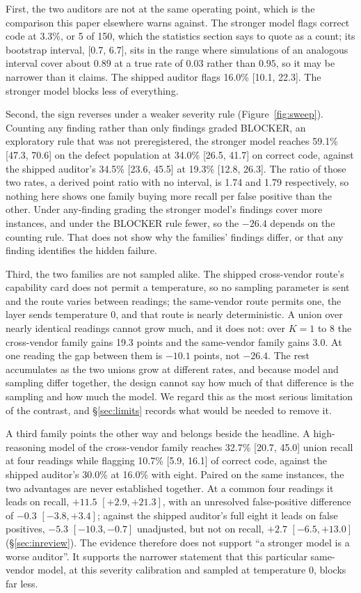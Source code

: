 First, the two auditors are not at the same operating point, which is the comparison this paper
elsewhere warns against. The stronger model flags correct code at 3.3\%, or 5 of 150, which the
statistics section says to quote as a count; its bootstrap interval, [0.7, 6.7], sits in the
range where simulations of an analogous interval cover about $0.89$ at a true rate of $0.03$
rather than $0.95$, so it may be narrower than it claims. The shipped auditor flags 16.0\% [10.1,
22.3]. The stronger model blocks less of everything.

Second, the sign reverses under a weaker severity rule (Figure~\ref{fig:sweep}). Counting any
finding rather than only findings graded BLOCKER, an exploratory rule that was not preregistered,
the stronger model reaches 59.1\% [47.3, 70.6] on the defect population at 34.0\% [26.5, 41.7] on
correct code, against the shipped auditor's 34.5\% [23.6, 45.5] at 19.3\% [12.8, 26.3]. The ratio
of those two rates, a derived point ratio with no interval, is 1.74 and 1.79 respectively, so
nothing here shows one family buying more recall per false positive than the other. Under
any-finding grading the stronger model's findings cover more instances, and under the BLOCKER rule
fewer, so the $-26.4$ depends on the counting rule. That does not show why the families' findings
differ, or that any finding identifies the hidden failure.

Third, the two families are not sampled alike. The shipped cross-vendor route's capability card
does not permit a temperature, so no sampling parameter is sent and the route varies between
readings; the same-vendor route permits one, the layer sends temperature $0$, and that route is
nearly deterministic. A union over nearly identical readings cannot grow much, and it does not:
over $K = 1$ to $8$ the cross-vendor family gains 19.3 points and the same-vendor family gains
3.0. At one reading the gap between them is $-10.1$ points, not $-26.4$. The rest accumulates as
the two unions grow at different rates, and because model and sampling differ together, the
design cannot say how much of that difference is the sampling and how much the model. We regard
this as the most serious limitation of the contrast, and \S\ref{sec:limits} records what would be
needed to remove it.

A third family points the other way and belongs beside the headline. A high-reasoning model of the
cross-vendor family reaches 32.7\% [20.7, 45.0] union recall at four readings while flagging
10.7\% [5.9, 16.1] of correct code, against the shipped auditor's 30.0\% at 16.0\% with eight.
Paired on the same instances, the two advantages are never established together. At a common four
readings it leads on recall, $+11.5$ $[+2.9, +21.3]$, with an unresolved false-positive difference
of $-0.3$ $[-3.8, +3.4]$; against the shipped auditor's full eight it leads on false positives,
$-5.3$ $[-10.3, -0.7]$ unadjusted, but not on recall, $+2.7$ $[-6.5, +13.0]$
(\S\ref{sec:inreview}). The evidence therefore does not support ``a stronger model is a worse
auditor''. It supports the narrower statement that this particular same-vendor model, at this
severity calibration and sampled at temperature $0$, blocks far less.

